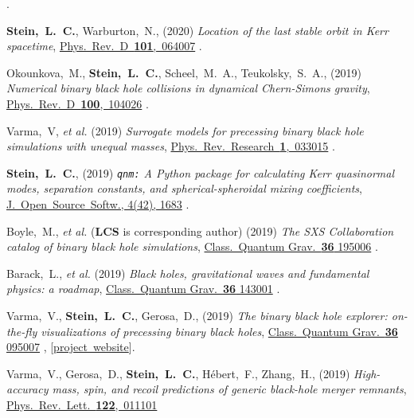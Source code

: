 \begin{etaremune}[start=\value{pubCounter}]
  .
\item
  {\bf Stein,~L.~C.},
  Warburton,~N.,
  (2020)
  {\it Location of the last stable orbit in Kerr spacetime},
  \href{https://doi.org/10.1103/PhysRevD.101.064007}{Phys.~Rev.~D~{\bf 101},~064007}
  .
\item
  Okounkova,~M.,
  {\bf Stein,~L.~C.},
  Scheel,~M.~A.,
  Teukolsky,~S.~A.,
  (2019)
  {\it Numerical binary black hole collisions in dynamical Chern-Simons gravity},
  \href{https://doi.org/10.1103/PhysRevD.100.104026}{Phys.~Rev.~D~{\bf 100},~104026}
  .
\item
  Varma,~V, {\it et al.}
  (2019)
  {\it Surrogate models for precessing binary black hole simulations with
  unequal masses},
  \href{https://doi.org/10.1103/PhysRevResearch.1.033015}{Phys.~Rev.~Research~{\bf 1},~033015}
  .
\item
  {\bf Stein,~L.~C.},
  (2019)
  \hspace{0.1em}
  {\it {\tt qnm:} A Python package for calculating Kerr quasinormal modes, separation constants, and spherical-spheroidal mixing coefficients},
  \href{https://doi.org/10.21105/joss.01683}{J.~Open~Source~Softw., 4(42), 1683}
  .
\item
  Boyle,~M., {\it et al.} ({\bf LCS} is corresponding author)
  (2019)
  {\it The SXS Collaboration catalog of binary black hole simulations},
  \href{https://doi.org/10.1088/1361-6382/ab34e2}{Class.~Quantum Grav.~{\bf 36} 195006}
  .
\item
  Barack,~L., {\it et al.}
  (2019)
  {\it Black holes, gravitational waves and fundamental physics: a roadmap},
  \href{https://doi.org/10.1088/1361-6382/ab0587}{Class.~Quantum Grav.~{\bf 36} 143001}
  .
\item
  Varma,~V., {\bf Stein,~L.~C.}, Gerosa,~D.,
  (2019)
  {\it The binary black hole explorer: on-the-fly visualizations of precessing binary black holes},
  \href{https://doi.org/10.1088/1361-6382/ab0ee9}{Class.~Quantum Grav.~{\bf 36} 095007}
  ,
  [\href{https://vijayvarma392.github.io/binaryBHexp/}{project~website}].
\item
  Varma,~V., Gerosa,~D., {\bf Stein,~L.~C.}, H\'ebert,~F.,  Zhang,~H.,
  (2019)
  {\it High-accuracy mass, spin, and recoil predictions of generic black-hole merger remnants},
  \href{https://doi.org/10.1103/PhysRevLett.122.011101}{Phys.~Rev.~Lett.~{\bf 122},~011101}

\end{etaremune}
